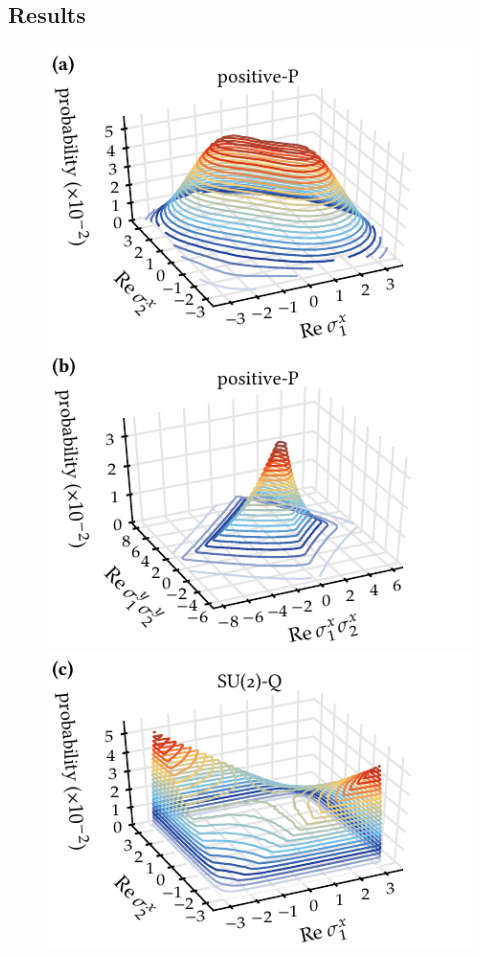 \subsection{Results}

\begin{figure}
    \includegraphics{figures_generated/bell/distribution_P1.pdf}%
    \includegraphics{figures_generated/bell/distribution_P2.pdf}\\
    \includegraphics{figures_generated/bell/distribution_Q1.pdf}%

\end{figure}
